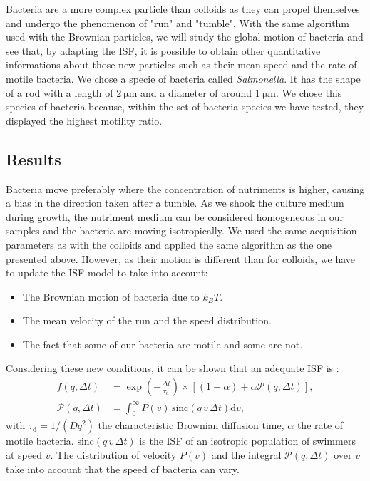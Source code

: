 \documentclass[%
 aip,
 jmp,%
 amsmath,amssymb,
reprint,%
]{revtex4-1}
\begin{document}
Bacteria are a more complex particle than colloids as they can propel themselves and undergo the phenomenon of "run" and "tumble". With the same algorithm used with the Brownian particles, we will study the global motion of bacteria and see that, by adapting the ISF, it is possible to obtain other quantitative informations about those new particles \citep{4_Martinez20121637} such as their mean speed and the rate of motile bacteria. We chose a specie of bacteria called \textit{Salmonella}. It has the shape of a rod with a length of $\SI{2}{\micro\meter}$ and a diameter of around $\SI{1}{\micro\meter}$. We chose this species of bacteria because, within the set of bacteria species we have tested, they displayed the highest motility ratio.

\subsection{Results}

Bacteria move preferably where the concentration of nutriments is higher, causing a bias in the direction taken after a tumble. As we shook the culture medium during growth, the nutriment medium can be considered homogeneous in our samples and the bacteria are moving isotropically. We used the same acquisition parameters as with the colloids and applied the same algorithm as the one presented above. However, as their motion is different than for colloids, we have to update the ISF model to take into account:

\begin{itemize}
\item The Brownian motion of bacteria due to $k_BT$.
\item The mean velocity of the run and the speed distribution.
\item The fact that some of our bacteria are motile and some are not.
\end{itemize}

Considering these new conditions, it can be shown that an adequate ISF is \citep{1_BactMobil}:
\begin{align}
f(q, \Delta t) &= \exp\left(-\frac{\Delta t}{\tau_\text{d}}\right)
\times\left[(1-\alpha) + \alpha \mathcal{P}(q, \Delta t)\right],\\
\mathcal{P}(q, \Delta t) &= \int_{0}^{\infty} P(v)\, \text{sinc}(q\, v\, \Delta t) \mathrm{d}v,
\end{align}
with $\tau_\text{d} = 1/(Dq^2)$ the characteristic Brownian diffusion time, $\alpha$ the rate of motile bacteria. $\text{sinc}(q\, v\, \Delta t)$ is the ISF of an isotropic population of swimmers at speed $v$. The distribution of velocity $P(v)$ and the integral $\mathcal{P}(q, \Delta t)$ over $v$ take into account that the speed of bacteria can vary. 
\end{document}
